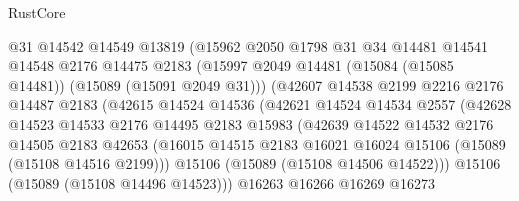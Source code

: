 \begin{lexlean}{RustCore}
\begin{coremodule}
                          @31
                          @14542
                          @14549
                          @13819
                          (@15962
                            @2050
                            @1798
                            @31
                            @34
                            @14481
                            @14541
                            @14548
                            @2176
                            @14475
                            @2183
                            (@15997
                              @2049
                              @14481
                              (@15084 (@15085 @14481))
                              (@15089 (@15091 @2049 @31)))
                            (@42607
                              @14538
                              @2199
                              @2216
                              @2176
                              @14487
                              @2183
                              (@42615
                                @14524
                                @14536
                                (@42621
                                  @14524
                                  @14534
                                  @2557
                                  (@42628
                                    @14523
                                    @14533
                                    @2176
                                    @14495
                                    @2183
                                    @15983
                                    (@42639
                                      @14522
                                      @14532
                                      @2176
                                      @14505
                                      @2183
                                      @42653
                                      (@16015
                                        @14515
                                        @2183
                                        @16021
                                        @16024
                                        @15106
                                        (@15089 (@15108 @14516 @2199)))
                                      @15106
                                      (@15089 (@15108 @14506 @14522)))
                                    @15106
                                    (@15089 (@15108 @14496 @14523)))
                                  @16263
                                  @16266
                                  @16269
                                  @16273

\end{coremodule}
\end{lexlean}
